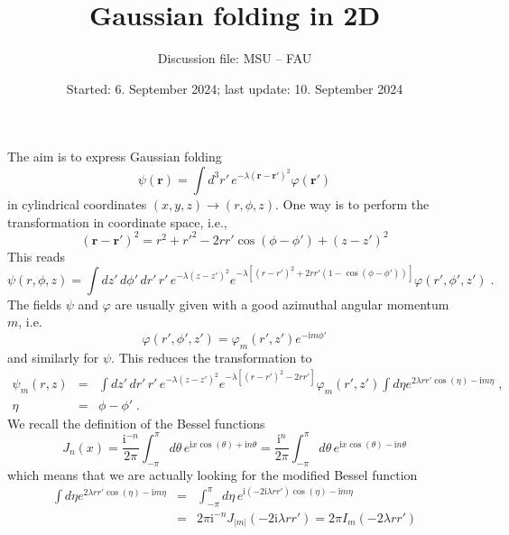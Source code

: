 \documentclass[12pt]{article}
\begin{document}
\title{Gaussian folding in 2D}
\author{Discussion file: MSU -- FAU}
\date{Started: 6. September 2024; last update: 10. September 2024}
\maketitle

The aim is to express Gaussian folding 
\begin{equation}
  \psi(\mathbf{r})
  =
  \int d^3r'\, e^{-\lambda(\mathbf{r}-\mathbf{r}')^2}
  \varphi(\mathbf{r}')
\end{equation}
in cylindrical coordinates $(x,y,z)\longrightarrow(r,\phi,z)$.
One way is to perform the transformation in coordinate space, i.e.,
\begin{equation}
  (\bm{r} - \bm{r}')^2 = r^2 + r'^2 - 2rr'\cos({\phi -\phi'}) + (z-z')^2
\end{equation}
This reads
\begin{equation}
  \psi(r,\phi,z)
  =
  \int dz'\,d\phi'\,dr'\,r'\,e^{-\lambda(z-z')^2}
  e^{-\lambda[(r-r')^2+2rr'(1-\cos(\phi-\phi'))]}
  \varphi(r',\phi',z')
  \;.
\end{equation}
The fields $\psi$ and $\varphi$ are usually given with a good azimuthal
angular momentum $m$, i.e.
\begin{equation}
  \varphi(r',\phi',z')
  =
  \varphi_m(r',z')e^{-\mathrm{i}m\phi'}
\end{equation}
and similarly for $\psi$. This reduces the transformation to
\begin{subequations}
\begin{eqnarray}
  \psi_m(r,z)
  &=&
  \int dz'\,dr'\,r'\,e^{-\lambda(z-z')^2} e^{-\lambda[(r-r')^2-2rr']}
  \varphi_m(r',z')\int d\eta e^{2\lambda rr'\cos(\eta)-\mathrm{i}m\eta}
  \;,
\\
  \eta&=&\phi-\phi'
  \;.
\end{eqnarray}
\end{subequations}
We recall the definition of the Bessel functions
\begin{equation}
  J_n(x)
  =
  \frac{\mathrm{i}^{-n}}{2\pi}
  \int_{-\pi}^\pi d\theta\,e^{\mathrm{i}x\cos(\theta)+\mathrm{i}n\theta}
  =
  \frac{\mathrm{i}^{n}}{2\pi}
  \int_{-\pi}^\pi d\theta\,e^{\mathrm{i}x\cos(\theta)-\mathrm{i}n\theta}
\end{equation}
which means that we are actually looking for the modified Bessel 
function
\begin{eqnarray}
  \int d\eta e^{2\lambda rr'\cos(\eta)-\mathrm{i}m\eta}
  &=&
  \int_{-\pi}^\pi d\eta\,e^{\mathrm{i}(-2\mathrm{i}\lambda rr')\cos(\eta)-\mathrm{i}m\eta}
\nonumber\\
  &=&
  2\pi\mathrm{i}^{-n} J_{|m|}(-2\mathrm{i}\lambda rr')
  =
  2\pi I_m(-2\lambda rr')
\end{eqnarray}
\end{document}
